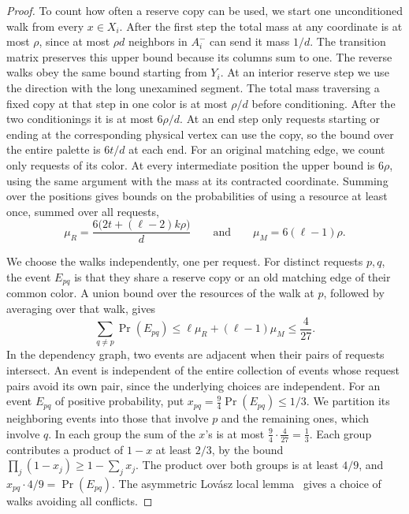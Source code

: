 \begin{proof}
To count how often a reserve copy can be used, we start one unconditioned walk from every \(x\in X_i\). After the first step the total mass at any coordinate is at most \(\rho\), since at most \(\rho d\) neighbors in \(A_i^-\) can send it mass \(1/d\). The transition matrix preserves this upper bound because its columns sum to one. The reverse walks obey the same bound starting from \(Y_i\). At an interior reserve step we use the direction with the long unexamined segment. The total mass traversing a fixed copy at that step in one color is at most \(\rho/d\) before conditioning. After the two conditionings it is at most \(6\rho/d\). At an end step only requests starting or ending at the corresponding physical vertex can use the copy, so the bound over the entire palette is \(6t/d\) at each end. For an original matching edge, we count only requests of its color. At every intermediate position the upper bound is \(6\rho\), using the same argument with the mass at its contracted coordinate. Summing over the positions gives bounds on the probabilities of using a resource at least once, summed over all requests,
\[
 \mu_R=\frac{6\bigl(2t+(\ell-2)k\rho\bigr)}{d}
 \qquad\text{and}\qquad
 \mu_M=6(\ell-1)\rho.
\]

We choose the walks independently, one per request. For distinct requests \(p,q\), the event \(E_{pq}\) is that they share a reserve copy or an old matching edge of their common color. A union bound over the resources of the walk at \(p\), followed by averaging over that walk, gives
\[
 \sum_{q\ne p}\Pr(E_{pq})\le\ell\mu_R+(\ell-1)\mu_M\le\frac{4}{27}.
\]
In the dependency graph, two events are adjacent when their pairs of requests intersect. An event is independent of the entire collection of events whose request pairs avoid its own pair, since the underlying choices are independent. For an event \(E_{pq}\) of positive probability, put \(x_{pq}=\tfrac94\Pr(E_{pq})\le1/3\). We partition its neighboring events into those that involve \(p\) and the remaining ones, which involve \(q\). In each group the sum of the \(x\)'s is at most \(\tfrac94\cdot\tfrac4{27}=\tfrac13\). Each group contributes a product of \(1-x\) at least \(2/3\), by the bound \(\prod_j(1-x_j)\ge1-\sum_j x_j\). The product over both groups is at least \(4/9\), and \(x_{pq}\cdot4/9=\Pr(E_{pq})\). The asymmetric Lov\'asz local lemma~\cite{EL} gives a choice of walks avoiding all conflicts.


\end{proof}

